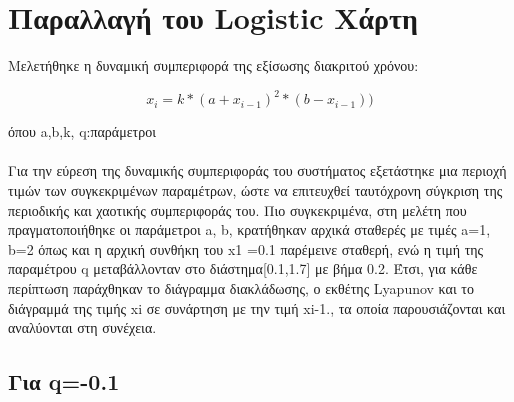 
\section{Παραλλαγή του Logistic Χάρτη}


Μελετήθηκε η δυναμική συμπεριφορά της εξίσωσης διακριτού χρόνου:

	\begin{equation}
		x_i=k*(a+x_{i-1})^2 *(b-x_{i-1}))
		\label{f:x1}
	\end{equation}


	όπου a,b,k, q:παράμετροι\\\\
	
	Για την εύρεση της δυναμικής συμπεριφοράς του συστήματος εξετάστηκε μια περιοχή τιμών των συγκεκριμένων παραμέτρων, ώστε να επιτευχθεί ταυτόχρονη σύγκριση της περιοδικής και χαοτικής συμπεριφοράς του. Πιο συγκεκριμένα, στη μελέτη που πραγματοποιήθηκε οι παράμετροι a, b, κρατήθηκαν αρχικά σταθερές με τιμές a=1, b=2  όπως και η αρχική συνθήκη του x1 =0.1 παρέμεινε  σταθερή,  ενώ η τιμή της παραμέτρου q μεταβάλλονταν στο διάστημα[0.1,1.7] με βήμα 0.2. Έτσι, για κάθε περίπτωση παράχθηκαν το διάγραμμα διακλάδωσης, ο εκθέτης Lyapunov και το διάγραμμά της τιμής xi σε συνάρτηση με την τιμή xi-1., τα οποία παρουσιάζονται και αναλύονται στη συνέχεια.
	
\subsection{Για q=-0.1}


